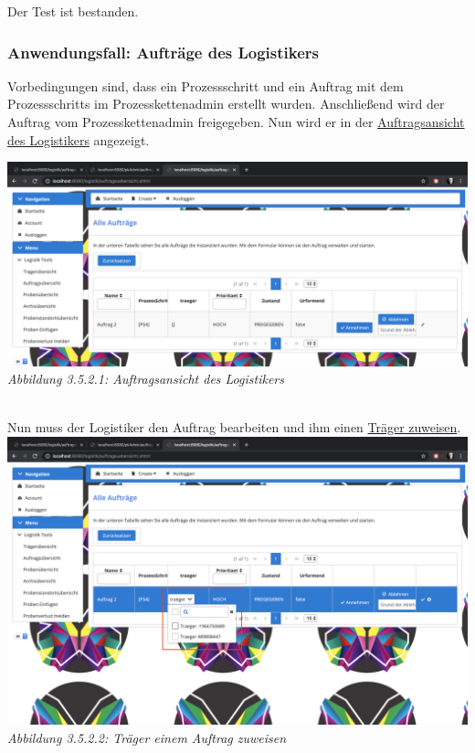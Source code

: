\documentclass[enabledeprecatedfontcommands,fontsize=12pt,paper=a4,twoside]{scrartcl}
\begin{document}
Der Test ist bestanden. 


\subsubsection{Anwendungsfall: Aufträge des Logistikers}

Vorbedingungen sind, dass ein Prozessschritt und ein Auftrag mit dem Prozessschritts im Prozesskettenadmin erstellt wurden. Anschließend wird der Auftrag vom Prozesskettenadmin freigegeben. Nun wird er in der \hyperlink{sc3.5.2.1}{Auftragsansicht des Logistikers} angezeigt. 

 \hypertarget{sc3.5.2.1}{
\includegraphics[width=1\textwidth]{Screenshots/3521.png}
\textit{Abbildung 3.5.2.1: Auftragsansicht des Logistikers}
} \\

Nun muss der Logistiker den Auftrag bearbeiten und ihm einen \hyperlink{sc3.5.2.2}{Träger zuweisen}. \\

 \hypertarget{sc3.5.2.2}{
\includegraphics[width=1\textwidth]{Screenshots/3522.png}
\textit{Abbildung 3.5.2.2: Träger einem Auftrag zuweisen}
} \\
\end{document}
